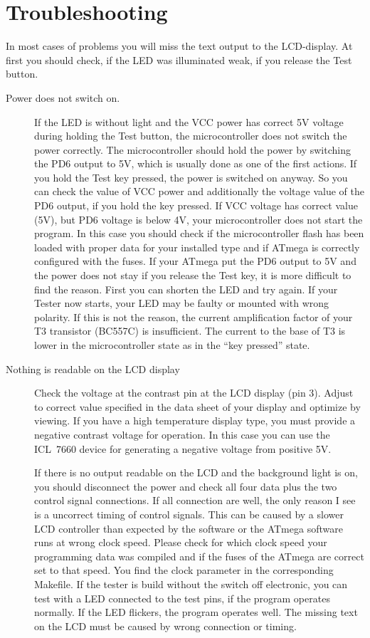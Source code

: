 \section{Troubleshooting}
In most cases of problems you will miss the text output to the LCD-display.
At first you should check, if the LED was illuminated weak, if you release
the Test button. 
\begin{description}

\item[Power does not switch on.]
If the LED is without light and the VCC power has correct
5V voltage during holding the Test button, the microcontroller does not switch the power
correctly. The microcontroller should hold the power by switching the
PD6 output to 5V, which is usually done as one of the first actions.
If you hold the Test key pressed, the power is switched on anyway.
So you can check the value of VCC power and additionally the voltage value
of the PD6 output, if you hold the key pressed.
If VCC voltage has correct value (5V), but PD6 voltage is
below 4V, your microcontroller does not start the program. In this case
you should check if the microcontroller flash has been loaded with proper data for your
installed type and if ATmega is correctly configured with the fuses.
If your ATmega put the PD6 output to 5V and the power does not stay if you
release the Test key, it is more difficult to find the reason.
First you can shorten the LED and try again. If your Tester now starts,
your LED may be faulty or mounted with wrong polarity. If this is not
the reason, the current amplification factor of your T3 transistor (BC557C)
is insufficient. The current to the base of T3 is lower in the microcontroller
state as in the ``key pressed'' state.

\item[Nothing is readable on the LCD display]
Check the voltage at the contrast pin at the LCD display (pin 3). Adjust to
correct value specified in the data sheet of your display and optimize by viewing.
If you have a high temperature display type, you must provide a negative contrast voltage
for operation. In this case you can use the ICL~7660 device for generating
a negative voltage from positive 5V.

If there is no output readable on the LCD and the background light is on,
you should disconnect the power and check all four data plus the two control signal connections.
If all connection are well, the only reason I see is a uncorrect timing of
control signals. This can be caused by a slower LCD controller than expected by
the software or the ATmega software runs at wrong clock speed. Please check for which
clock speed your programming data was compiled  and if the fuses of the
ATmega are correct set to that speed. You find the clock parameter in the corresponding
Makefile.
If the tester is build without the switch off electronic, you can test with
a LED connected to the test pins, if the program operates normally.
If the LED flickers, the program operates well. The missing text on the
LCD must be caused by wrong connection or timing.



\end{description}
